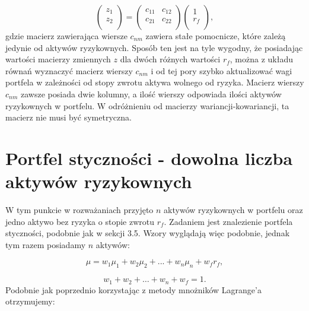 \documentclass[magister]{dyplom}
\begin{document}
\begin{equation}
	\left( \begin{array}{c}
		z_1\\
		z_2\\
	\end{array} \right) = 
	\left( \begin{array}{cc}
		c_{11}& c_{12}\\
		c_{21}& c_{22}\\
	\end{array} \right)
	\left( \begin{array}{c}
		1\\
		r_f\\
	\end{array} \right),
\end{equation}
gdzie macierz zawierająca wiersze $c_{nm}$ zawiera stałe pomocnicze, które zależą jedynie od aktywów ryzykownych. Sposób ten jest na tyle wygodny, że posiadając wartości macierzy zmiennych $z$ dla dwóch różnych wartości $r_f$, można z układu równań wyznaczyć macierz wierszy $c_{nm}$ i od tej pory szybko aktualizować wagi portfela w zależności od stopy zwrotu aktywa wolnego od ryzyka. Macierz wierszy $c_{nm}$ zawsze posiada dwie kolumny, a ilość wierszy odpowiada ilości aktywów ryzykownych w portfelu. W odróżnieniu od macierzy wariancji-kowariancji, ta macierz nie musi być symetryczna.

\section{Portfel styczności - dowolna liczba aktywów ryzykownych}
W tym punkcie w rozważaniach przyjęto $n$ aktywów ryzykownych w portfelu oraz jedno aktywo bez ryzyka o stopie zwrotu $r_f$. Zadaniem jest znalezienie portfela styczności, podobnie jak w sekcji 3.5. Wzory wyglądają więc podobnie, jednak tym razem posiadamy $n$ aktywów:

\begin{equation}
	\mu = w_1\mu_1 + w_2\mu_2 + ... + w_n\mu_n + w_fr_f,
\end{equation}

\begin{equation}
	w_1 + w_2 + \dots + w_n + w_f = 1.
\end{equation}
Podobnie jak poprzednio korzystając z metody mnożników Lagrange'a otrzymujemy:
\end{document}
